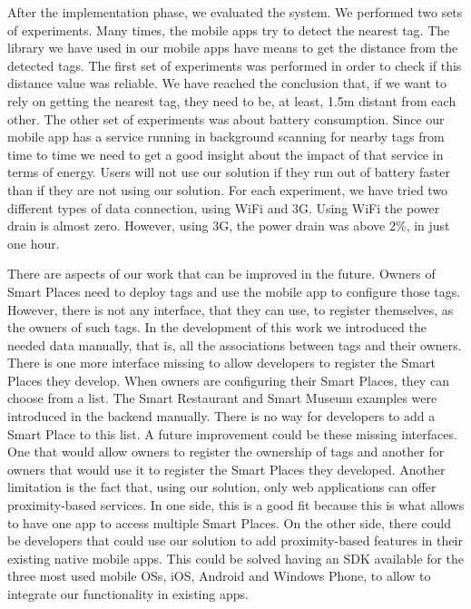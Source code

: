 After the implementation phase, we evaluated the system.
We performed two sets of experiments.
Many times, the mobile apps try to detect the nearest tag.
The library we have used in our mobile apps have means to get the distance from the detected tags.
The first set of experiments was performed in order to check if this distance value was reliable.
We have reached the conclusion that, if we want to rely on getting the nearest tag, they need to be, at least, 1.5m distant from each other.
The other set of experiments was about battery consumption.
Since our mobile app has a service running in background scanning for nearby tags from time to time we need to get a good insight about the impact of that service in terms of energy.
Users will not use our solution if they run out of battery faster than if they are not using our solution.
For each experiment, we have tried two different types of data connection, using \gls{WiFi} and \gls{3G}.
Using \gls{WiFi} the power drain is almost zero.
However, using \gls{3G}, the power drain was above 2\%, in just one hour.

There are aspects of our work that can be improved in the future.
Owners of Smart Places need to deploy tags and use the mobile app to configure those tags.
However, there is not any interface, that they can use, to register themselves, as the owners of such tags.
In the development of this work we introduced the needed data manually, that is,
all the associations between tags and their owners.
There is one more interface missing to allow developers to register the Smart Places they develop.
When owners are configuring their Smart Places, they can choose from a list.
The Smart Restaurant and Smart Museum examples were introduced in the backend manually.
There is no way for developers to add a Smart Place to this list.
A future improvement could be these missing interfaces.
One that would allow owners to register the ownership of tags and another for owners that would use it to register the Smart Places they developed.
Another limitation is the fact that, using our solution, only web applications can offer proximity-based services.
In one side, this is a good fit because this is what allows to have one app to access multiple Smart Places.
On the other side, there could be developers that could use our solution to add proximity-based features in their existing native mobile apps.
This could be solved having an \gls{SDK} available for the three most used mobile \glspl{OS}, iOS, Android and Windows Phone, to allow to integrate our functionality in existing apps.

